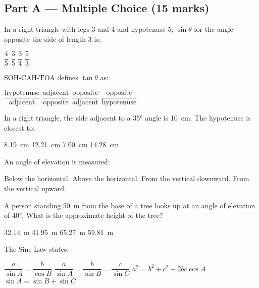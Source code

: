 \documentclass[addpoints]{exam}
\begin{document}
\newpage
\begin{questions}

\section*{Part A --- Multiple Choice (15 marks)}
\vspace{5mm}

\question[1]
In a right triangle with legs 3 and 4 and hypotenuse 5, $\sin\theta$ for the angle opposite the side of length 3 is:
\begin{choices}
    \choice $\dfrac{4}{5}$
    \correctchoice $\dfrac{3}{5}$
    \choice $\dfrac{3}{4}$
    \choice $\dfrac{5}{3}$
\end{choices}

\question[1]
SOH-CAH-TOA defines $\tan\theta$ as:
\begin{choices}
    \choice $\dfrac{\text{hypotenuse}}{\text{adjacent}}$
    \choice $\dfrac{\text{adjacent}}{\text{opposite}}$
    \correctchoice $\dfrac{\text{opposite}}{\text{adjacent}}$
    \choice $\dfrac{\text{opposite}}{\text{hypotenuse}}$
\end{choices}

\question[1]
In a right triangle, the side adjacent to a \ang{35} angle is \SI{10}{cm}. The hypotenuse is closest to:
\begin{choices}
    \choice \SI{8.19}{cm}
    \correctchoice \SI{12.21}{cm}
    \choice \SI{7.00}{cm}
    \choice \SI{14.28}{cm}
\end{choices}

\question[1]
An angle of elevation is measured:
\begin{choices}
    \choice Below the horizontal.
    \correctchoice Above the horizontal.
    \choice From the vertical downward.
    \choice From the vertical upward.
\end{choices}

\question[1]
A person standing \SI{50}{m} from the base of a tree looks up at an angle of elevation of \ang{40}. What is the approximate height of the tree?
\begin{choices}
    \choice \SI{32.14}{m}
    \correctchoice \SI{41.95}{m}
    \choice \SI{65.27}{m}
    \choice \SI{59.81}{m}
\end{choices}

\question[1]
The Sine Law states:
\begin{choices}
    \choice $\dfrac{a}{\sin A} = \dfrac{b}{\cos B}$
    \correctchoice $\dfrac{a}{\sin A} = \dfrac{b}{\sin B} = \dfrac{c}{\sin C}$
    \choice $a^2 = b^2 + c^2 - 2bc\cos A$
    \choice $\sin A = \sin B + \sin C$
\end{choices}


\end{questions}
\end{document}
